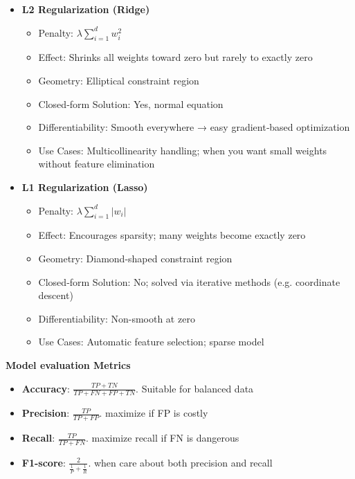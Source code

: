 \documentclass[8pt,twocolumn]{article}
\begin{document}
\begin{itemize}
    \setlength{\itemsep}{0pt}
    \setlength{\parskip}{0pt}
    \item \textbf{L2 Regularization (Ridge)}\vspace{-0.6em}
      \begin{itemize}
        \setlength{\itemsep}{0pt}
        \setlength{\parskip}{0pt}
        \item Penalty: \(\lambda \sum_{i=1}^d w_i^2\)
        \item Effect: Shrinks all weights toward zero but rarely to exactly zero
        \item Geometry: Elliptical constraint region
        \item Closed‐form Solution: Yes, normal equation
        \item Differentiability: Smooth everywhere → easy gradient‐based optimization
        \item Use Cases: Multicollinearity handling; when you want small weights without feature elimination
      \end{itemize}
    \item \textbf{L1 Regularization (Lasso)}\vspace{-0.6em}
      \begin{itemize}
        \setlength{\itemsep}{0pt}
        \setlength{\parskip}{0pt}
        \item Penalty: \(\lambda \sum_{i=1}^d |w_i|\)
        \item Effect: Encourages sparsity; many weights become exactly zero
        \item Geometry: Diamond-shaped constraint region
        \item Closed‐form Solution: No; solved via iterative methods (e.g. coordinate descent)
        \item Differentiability: Non-smooth at zero
        \item Use Cases: Automatic feature selection; sparse model
      \end{itemize}
  \end{itemize}\vspace{-0.6em}
\textbf{Model evaluation Metrics}\vspace{-0.6em}
\begin{itemize}
    \setlength{\itemsep}{0pt}
    \setlength{\parskip}{0pt}
    \item \textbf{Accuracy}: $\frac{TP + TN}{TP + FN + FP + TN}$. Suitable for balanced data
    \item \textbf{Precision}: $\frac{TP}{TP + FP}$. maximize if FP is costly
    \item \textbf{Recall}: $\frac{TP}{TP + FN}$. maximize recall if FN is dangerous
    \item \textbf{F1-score}: $\frac{2}{\frac{1}{P} + \frac{1}{R}}$. when care about both precision and recall
\end{itemize}
\end{document}

